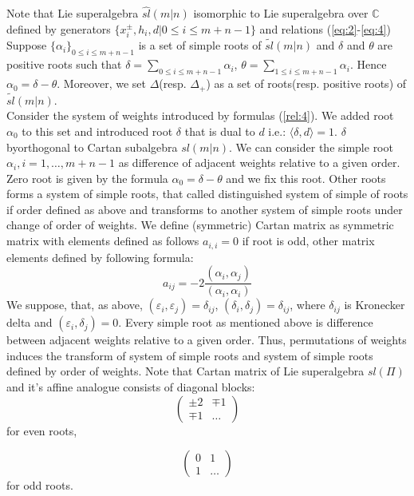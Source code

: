 \documentclass[english]{elsarticle}
\numberwithin{equation}{section}
\begin{document}
Note that Lie superalgebra $\hat{sl}(m|n)$ isomorphic to Lie superalgebra over $\mathbb{C}$ defined by generators $\{x_i^{\pm},h_i,d|0\leq i \leq m+n-1\}$ and relations (\ref{eq:2}-\ref{eq:4})\\
Suppose $\{\alpha_i\}_{0\leq i \leq m+n-1}$ is a set of simple roots of $\tilde{sl}(m|n)$ and $\delta$ and $\theta$ are positive roots such that $\delta = \sum\limits_{0 \leq i \leq m+n-1} \alpha_i$, $\theta = \sum\limits_{1 \leq i \leq m+n-1} \alpha_i$. Hence $\alpha_{0}=\delta-\theta$.
Moreover, we set $\Delta$(resp. $\Delta_+$) as a set of roots(resp. positive roots) of $\tilde{sl}(m|n)$.\\
Consider the system of weights introduced by formulas (\ref{rel:4}). We added root $\alpha_{0}$ to this set and introduced root $\delta$ that is dual to $d$ i.e.: $\langle \delta , d \rangle =1$. $\delta$ byorthogonal to Cartan subalgebra $sl(m|n)$. We can consider the simple root $\alpha_{i},i=1,\ldots,m+n-1$ as difference of adjacent weights relative to a given order. Zero root is given by the formula $\alpha_{0}=\delta - \theta$ and we fix this root. Other roots forms a system of simple roots, that called distinguished system of simple of roots if order defined as above and transforms to another system of simple roots under change of order of weights. We define (symmetric) Cartan matrix as symmetric matrix with elements defined as follows $a_{i,i}=0$ if root is odd, other matrix elements defined by following formula:
\begin{equation}
    a_{ij}=-2\frac{(\alpha_i,\alpha_j)}{(\alpha_i,\alpha_i)}
\end{equation}
We suppose, that, as above, $(\varepsilon_{i},\varepsilon_{j})=\delta_{ij}$, $(\delta_{i},\delta_{j})=\delta_{ij}$, where $\delta_{ij}$ is Kronecker delta and $(\varepsilon_{i},\delta_{j})=0$. Every simple root as mentioned above is difference between adjacent weights relative to a given order. Thus, permutations of weights induces the transform of system of simple roots and system of simple roots defined by order of weights. Note that Cartan matrix of Lie superalgebra $sl(\Pi)$ and it's affine analogue consists of diagonal blocks:
\begin{equation}
   \begin{pmatrix}
     \pm 2 & \mp 1\\
    \mp 1 & \ldots
    \end{pmatrix}
\end{equation} for even roots,

\begin{equation}
   \begin{pmatrix}
      0 &  1\\
    1 & \ldots
    \end{pmatrix}
\end{equation} for odd roots.
\end{document}

